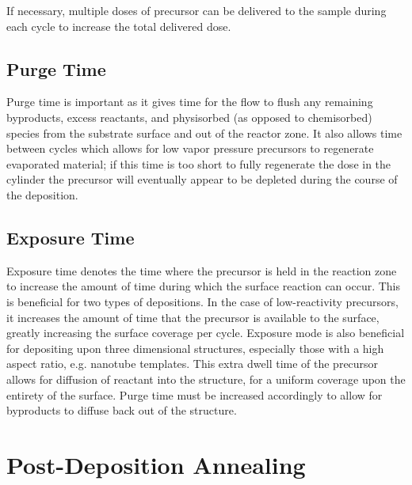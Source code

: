 If necessary, multiple doses of precursor can be delivered to the sample during each cycle to increase the total delivered dose.


\subsection{Purge Time}

Purge time is important as it gives time for the  flow to flush any remaining byproducts, excess reactants, and physisorbed (as opposed to chemisorbed) species from the substrate surface and out of the reactor zone. It also allows time between cycles which allows for low vapor pressure precursors to regenerate evaporated material; if this time is too short to fully regenerate the dose in the cylinder the precursor will eventually appear to be depleted during the course of the deposition.\cite{ALD-Handbook,Leskela_2002}


\subsection{Exposure Time}

Exposure time denotes the time where the precursor is held in the reaction zone to increase the amount of time during which the surface reaction can occur. This is beneficial for two types of depositions. In the case of low-reactivity precursors, it increases the amount of time that the precursor is available to the surface, greatly increasing the surface coverage per cycle. Exposure mode is also beneficial for depositing upon three dimensional structures, especially those with a high aspect ratio, e.g. nanotube templates. This extra dwell time of the precursor allows for diffusion of reactant into the structure, for a uniform coverage upon the entirety of the surface. Purge time must be increased accordingly to allow for byproducts to diffuse back out of the structure.\cite{ALD-Handbook,gordon_kinetic_2003,Leskela_2002}


\section{Post-Deposition Annealing}
\label{sec:SampFab-Annealing}

